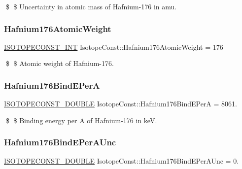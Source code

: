 \$ \$ Uncertainty in atomic mass of Hafnium-\/176 in amu. \mbox{\label{group___isotope_const-_hafnium-_hf176_ga4a82d1e3f0e3a22cb69c875b7fc5e0f4}} 
\subsubsection{\texorpdfstring{Hafnium176\+Atomic\+Weight}{Hafnium176AtomicWeight}}
{\footnotesize\ttfamily \mbox{\hyperlink{group___isotope_const-_macros_ga5f18360b3e99483a35c32d789e62621c}{I\+S\+O\+T\+O\+P\+E\+C\+O\+N\+S\+T\+\_\+\+I\+NT}} Isotope\+Const\+::\+Hafnium176\+Atomic\+Weight = 176}

\$ \$ Atomic weight of Hafnium-\/176. \mbox{\label{group___isotope_const-_hafnium-_hf176_ga1ebbc67d0cc4296c5beed321cdb9ba76}} 
\subsubsection{\texorpdfstring{Hafnium176\+Bind\+E\+PerA}{Hafnium176BindEPerA}}
{\footnotesize\ttfamily \mbox{\hyperlink{group___isotope_const-_macros_ga8f45a7272ce02c0b4c65c44636ed719a}{I\+S\+O\+T\+O\+P\+E\+C\+O\+N\+S\+T\+\_\+\+D\+O\+U\+B\+LE}} Isotope\+Const\+::\+Hafnium176\+Bind\+E\+PerA = 8061.}

\$ \$ Binding energy per A of Hafnium-\/176 in keV. \mbox{\label{group___isotope_const-_hafnium-_hf176_gaf09f3f24357e54fae9e83d9d1b4ab932}} 
\subsubsection{\texorpdfstring{Hafnium176\+Bind\+E\+Per\+A\+Unc}{Hafnium176BindEPerAUnc}}
{\footnotesize\ttfamily \mbox{\hyperlink{group___isotope_const-_macros_ga8f45a7272ce02c0b4c65c44636ed719a}{I\+S\+O\+T\+O\+P\+E\+C\+O\+N\+S\+T\+\_\+\+D\+O\+U\+B\+LE}} Isotope\+Const\+::\+Hafnium176\+Bind\+E\+Per\+A\+Unc = 0.}

